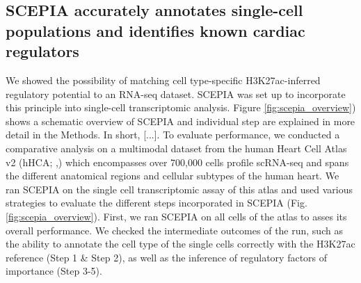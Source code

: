 \subsection{SCEPIA accurately annotates single-cell populations and identifies known cardiac regulators}

We showed the possibility of matching cell type-specific H3K27ac-inferred regulatory potential to an RNA-seq dataset. SCEPIA was set up to incorporate this principle into single-cell transcriptomic analysis. Figure \ref{fig:scepia_overview}) shows a schematic overview of SCEPIA and individual step are explained in more detail in the Methods. In short, [...].  To evaluate performance, we conducted a comparative analysis on a multimodal dataset from the human Heart Cell Atlas v2 (hHCA; \cite{Kanemaru2023},) which encompasses over 700,000 cells profile scRNA-seq and spans the different anatomical regions and cellular subtypes of the human heart. We ran SCEPIA on the single cell transcriptomic assay of this atlas and used various strategies to evaluate the different steps incorporated in SCEPIA (Fig. \ref{fig:scepia_overview}). First, we ran SCEPIA on all cells of the atlas to asses its overall performance. We checked the intermediate outcomes of the run, such as the ability to annotate the cell type of the single cells correctly with the H3K27ac reference (Step 1 \& Step 2), as well as the inference of regulatory factors of importance (Step 3-5). 

